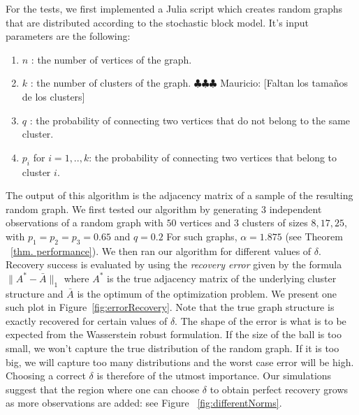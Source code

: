 \documentclass[12pt]{amsart}
\theoremstyle{remark}
\newcommand{\mv}[1]{{\color{red} \sf $\clubsuit\clubsuit\clubsuit$ Mauricio: [#1]}}
\begin{document}
For the tests, we first implemented a Julia script which creates random graphs that are distributed according to the stochastic block model. It's input parameters are the following:
\begin{enumerate}
\item $n$ : the number of vertices of the graph.
\item $k$ : the number of clusters of the graph.\mv{Faltan los tama\~nos de los clusters}
\item $q$ : the probability of connecting two vertices that do not belong to the same cluster.
\item $p_i$ for $i=1,..,k$: the probability of connecting two vertices that belong to cluster $i$.
\end{enumerate}
The output of this algorithm is the adjacency matrix of a sample of the resulting random graph. 
We first tested our algorithm by generating $3$ independent observations of a random graph with $50$ vertices and $3$ clusters of sizes $8,17,25$, with $p_1=p_2=p_3=0.65$ and $q=0.2$ For such graphs, $\alpha = 1.875$ (see Theorem ~\ref{thm. performance}). We then ran our algorithm for different values of $\delta$. Recovery success is evaluated by using the \textit{recovery error} given by the formula $\|A^*-\bar{A}\|_1$
where $A^*$ is the true adjacency matrix of the underlying cluster structure and $\bar{A}$ is the optimum of the optimization problem.
We present one such plot in Figure~\ref{fig:errorRecovery}. Note that the true graph structure is exactly recovered for certain values of $\delta$.
The shape of the error is what is to be expected from the Wasserstein robust formulation. If the size of the ball is too small, we won't capture the true distribution of the random graph. If it is too big, we will capture too many distributions and the worst case error will be high.
Choosing a correct $\delta$ is therefore of the utmost importance. Our simulations suggest that the region where one can choose $\delta$ to obtain perfect recovery grows as more observations are added: see Figure~ \ref{fig:differentNorms}.
\end{document}
